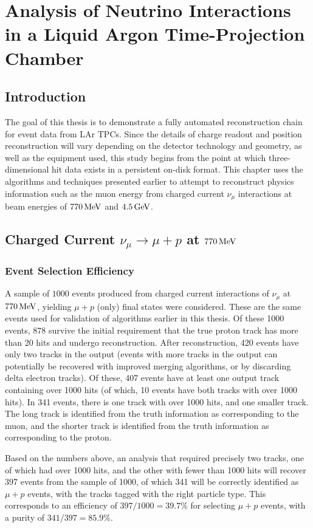 \chapter{Analysis of Neutrino Interactions in a Liquid Argon Time-Projection Chamber}\label{chapter:Analysis}
\section{Introduction}
The goal of this thesis is to demonstrate a fully automated reconstruction chain for event data from \ac{LAr TPC}s. Since the details of charge readout and position reconstruction will vary depending on the detector technology and geometry, as well as the equipment used, this study begins from the point at which three-dimensional hit data exists in a persistent on-disk format. This chapter uses the algorithms and techniques presented earlier to attempt to reconstruct physics information such as the muon energy from charged current $\nu_\mu$ interactions at beam energies of $770\,\mathrm{MeV}$ and $4.5\,\mathrm{GeV}$.

\section{Charged Current $\nu_\mu \rightarrow \mu + p$ at $770\,\mathrm{MeV}$}
\subsection{Event Selection Efficiency}
A sample of $1000$ events produced from charged current interactions of $\nu_\mu$ at $770\,\mathrm{MeV}$, yielding $\mu + p$ (only) final states were considered. These are the same events used for validation of algorithms earlier in this thesis. Of these 1000 events, 878 survive the initial requirement that the true proton track has more than 20 hits and undergo reconstruction. After reconstruction, 420 events have only two tracks in the output (events with more tracks in the output can potentially be recovered with improved merging algorithms, or by discarding delta electron tracks). Of these, 407 events have at least one output track containing over 1000 hits (of which, 10 events have both tracks with over 1000 hits). In 341 events, there is one track with over 1000 hits, and one smaller track. The long track is identified from the truth information as corresponding to the muon, and the shorter track is identified from the truth information as corresponding to the proton.

Based on the numbers above, an analysis that required precisely two tracks, one of which had over 1000 hits, and the other with fewer than 1000 hits will recover 397 events from the sample of 1000, of which 341 will be correctly identified as $\mu + p$ events, with the tracks tagged with the right particle type. This corresponds to an efficiency of $397/1000 = 39.7\%$ for selecting $\mu + p$ events, with a purity of $341/397 = 85.9\%$.

